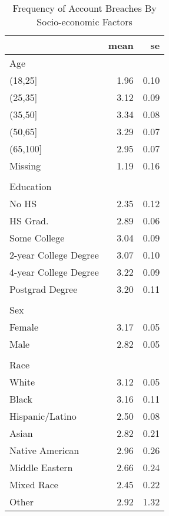 \begin{table}[!htb]
\centering
\caption{Frequency of Account Breaches By Socio-economic Factors} 
\label{table:socdem_dat}
\begingroup\small
\begin{tabular}{lrr}
  \hline
 & mean & se \\ 
  \hline
Age &  &  \\ 
  (18,25] & 1.96 & 0.10 \\ 
  (25,35] & 3.12 & 0.09 \\ 
  (35,50] & 3.34 & 0.08 \\ 
  (50,65] & 3.29 & 0.07 \\ 
  (65,100] & 2.95 & 0.07 \\ 
  Missing & 1.19 & 0.16 \\ 
   &  &  \\ 
  Education &  &  \\ 
  No HS & 2.35 & 0.12 \\ 
  HS Grad. & 2.89 & 0.06 \\ 
  Some College & 3.04 & 0.09 \\ 
  2-year College Degree & 3.07 & 0.10 \\ 
  4-year College Degree & 3.22 & 0.09 \\ 
  Postgrad Degree & 3.20 & 0.11 \\ 
   &  &  \\ 
  Sex &  &  \\ 
  Female & 3.17 & 0.05 \\ 
  Male & 2.82 & 0.05 \\ 
   &  &  \\ 
  Race &  &  \\ 
  White & 3.12 & 0.05 \\ 
  Black & 3.16 & 0.11 \\ 
  Hispanic/Latino & 2.50 & 0.08 \\ 
  Asian & 2.82 & 0.21 \\ 
  Native American & 2.96 & 0.26 \\ 
  Middle Eastern & 2.66 & 0.24 \\ 
  Mixed Race & 2.45 & 0.22 \\ 
  Other & 2.92 & 1.32 \\ 
   \hline
\end{tabular}
\endgroup
\end{table}

